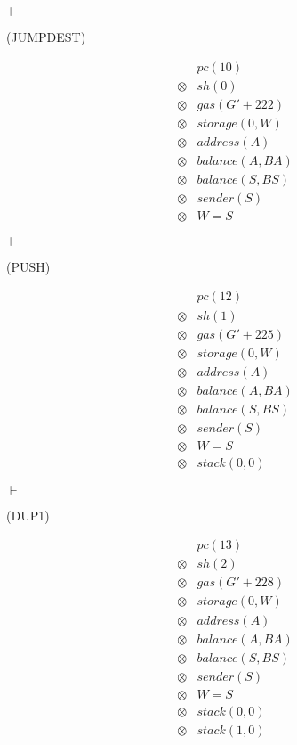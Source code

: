 $\vdash$ \begin{flushright}(JUMPDEST)\end{flushright}

\[
  \begin{array}{rcl}
    &&pc(10)\\
    &\otimes& sh(0)\\
    &\otimes& gas(G' + 222)\\
    &\otimes& storage(0, W)\\
    &\otimes& address(A)\\
    &\otimes& balance(A, BA)\\
    &\otimes& balance(S, BS)\\
    &\otimes& sender(S)\\
    &\otimes& W = S
  \end{array}
\]

$\vdash$ \begin{flushright}(PUSH)\end{flushright}

\[
  \begin{array}{rcl}
    &&pc(12)\\
    &\otimes& sh(1)\\
    &\otimes& gas(G' + 225)\\
    &\otimes& storage(0, W)\\
    &\otimes& address(A)\\
    &\otimes& balance(A, BA)\\
    &\otimes& balance(S, BS)\\
    &\otimes& sender(S)\\
    &\otimes& W = S\\
    &\otimes& stack(0, 0)
  \end{array}
\]

$\vdash$ \begin{flushright}(DUP1)\end{flushright}

\[
  \begin{array}{rcl}
    &&pc(13)\\
    &\otimes& sh(2)\\
    &\otimes& gas(G' + 228)\\
    &\otimes& storage(0, W)\\
    &\otimes& address(A)\\
    &\otimes& balance(A, BA)\\
    &\otimes& balance(S, BS)\\
    &\otimes& sender(S)\\
    &\otimes& W = S\\
    &\otimes& stack(0, 0)\\
    &\otimes& stack(1, 0)
  \end{array}
\]


